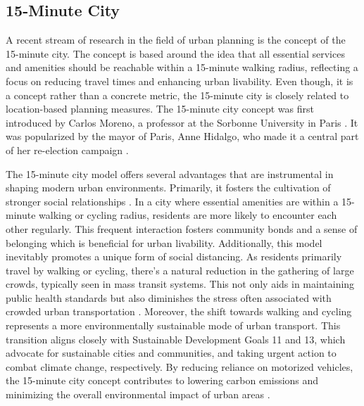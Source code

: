 \subsection{15-Minute City}
\label{subsec:15_minute_city}


A recent stream of research in the field of urban planning is the concept of the 15-minute city.
The concept is based around the idea that all essential services and amenities should be reachable within a 15-minute walking radius, reflecting a focus on reducing travel times and enhancing urban livability.
Even though, it is a concept rather than a concrete metric, the 15-minute city is closely related to location-based planning measures.
The 15-minute city concept was first introduced by Carlos Moreno, a professor at the Sorbonne University in Paris .
It was popularized by the mayor of Paris, Anne Hidalgo, who made it a central part of her re-election campaign .

The 15-minute city model offers several advantages that are instrumental in shaping modern urban environments.
Primarily, it fosters the cultivation of stronger social relationships .
In a city where essential amenities are within a 15-minute walking or cycling radius, residents are more likely to encounter each other regularly. 
This frequent interaction fosters community bonds and a sense of belonging which is beneficial for urban livability.
Additionally, this model inevitably promotes a unique form of social distancing. 
As residents primarily travel by walking or cycling, there's a natural reduction in the gathering of large crowds, typically seen in mass transit systems. 
This not only aids in maintaining public health standards but also diminishes the stress often associated with crowded urban transportation .
Moreover, the shift towards walking and cycling represents a more environmentally sustainable mode of urban transport. 
This transition aligns closely with Sustainable Development Goals 11 and 13, which advocate for sustainable cities and communities, and taking urgent action to combat climate change, respectively. 
By reducing reliance on motorized vehicles, the 15-minute city concept contributes to lowering carbon emissions and minimizing the overall environmental impact of urban areas .

